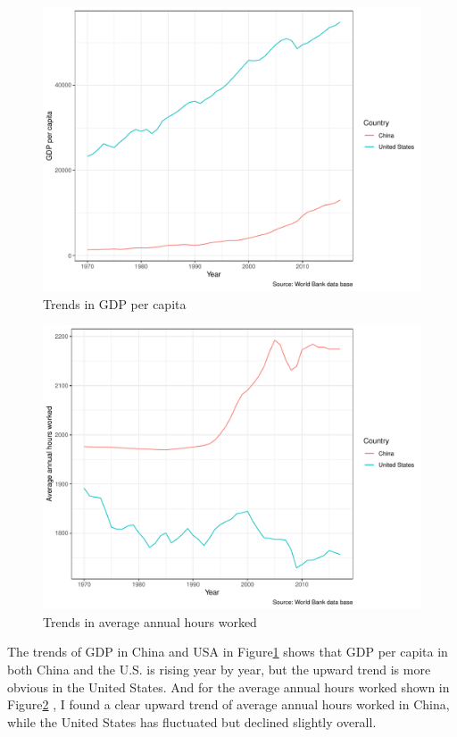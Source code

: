 \documentclass[11pt,a4paper,]{article}
\begin{document}
\begin{figure}
\centering
\includegraphics{report_files/figure-latex/Figure1-1.pdf}
\caption{\label{fig:Figure1}Trends in GDP per capita}
\end{figure}

\begin{figure}
\centering
\includegraphics{report_files/figure-latex/Figure2-1.pdf}
\caption{\label{fig:Figure2}Trends in average annual hours worked}
\end{figure}

The trends of GDP in China and USA in Figure\ref{fig:Figure1} shows that GDP per capita in both China and the U.S. is rising year by year, but the upward trend is more obvious in the United States. And for the average annual hours worked shown in Figure\ref{fig:Figure2} , I found a clear upward trend of average annual hours worked in China, while the United States has fluctuated but declined slightly overall.
\end{document}
